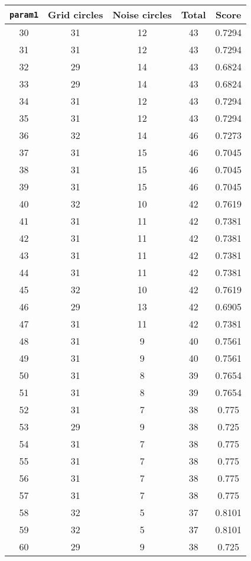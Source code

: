 \documentclass[letterpaper, 12pt]{article}
\begin{document}
\begin{longtable}{|c|c|c|c|c|}
\hline
\textbf{\texttt{param1}} & \textbf{Grid circles} & \textbf{Noise circles} & \textbf{Total} & \textbf{Score} \\
\hline
30 & 31 & 12 & 43 & 0.7294 \\
\hline
31 & 31 & 12 & 43 & 0.7294 \\
\hline
32 & 29 & 14 & 43 & 0.6824 \\
\hline
33 & 29 & 14 & 43 & 0.6824 \\
\hline
34 & 31 & 12 & 43 & 0.7294 \\
\hline
35 & 31 & 12 & 43 & 0.7294 \\
\hline
36 & 32 & 14 & 46 & 0.7273 \\
\hline
37 & 31 & 15 & 46 & 0.7045 \\
\hline
38 & 31 & 15 & 46 & 0.7045 \\
\hline
39 & 31 & 15 & 46 & 0.7045 \\
\hline
40 & 32 & 10 & 42 & 0.7619 \\
\hline
41 & 31 & 11 & 42 & 0.7381 \\
\hline
42 & 31 & 11 & 42 & 0.7381 \\
\hline
43 & 31 & 11 & 42 & 0.7381 \\
\hline
44 & 31 & 11 & 42 & 0.7381 \\
\hline
45 & 32 & 10 & 42 & 0.7619 \\
\hline
46 & 29 & 13 & 42 & 0.6905 \\
\hline
47 & 31 & 11 & 42 & 0.7381 \\
\hline
48 & 31 & 9 & 40 & 0.7561 \\
\hline
49 & 31 & 9 & 40 & 0.7561 \\
\hline
50 & 31 & 8 & 39 & 0.7654 \\
\hline
51 & 31 & 8 & 39 & 0.7654 \\
\hline
52 & 31 & 7 & 38 & 0.775 \\
\hline
53 & 29 & 9 & 38 & 0.725 \\
\hline
54 & 31 & 7 & 38 & 0.775 \\
\hline
55 & 31 & 7 & 38 & 0.775 \\
\hline
56 & 31 & 7 & 38 & 0.775 \\
\hline
57 & 31 & 7 & 38 & 0.775 \\
\hline
58 & 32 & 5 & 37 & 0.8101 \\
\hline
59 & 32 & 5 & 37 & 0.8101 \\
\hline
60 & 29 & 9 & 38 & 0.725 \\
\hline

\end{longtable}
\end{document}
